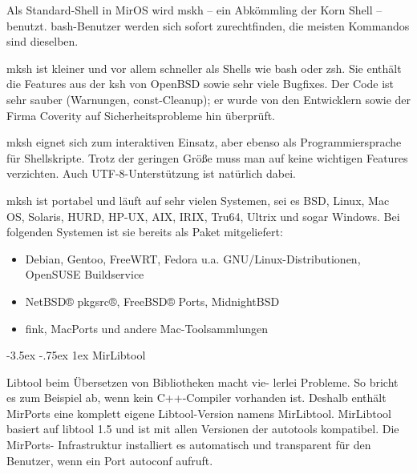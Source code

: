 \documentclass[
a4paper,landscape,%
notumble%
]{leaflet}
\makeatletter
\newcommand{\sectbox}[1]{%
 \noindent\protect\colorbox{yellow}{%
 \@tempdima=\hsize
 \advance\@tempdima by-2\fboxsep
 \advance\@tempdima by-2\fboxrule
 \protect\parbox{\@tempdima}{%
 \medskip
 \raggedright %
 #1 \medskip
}}}
\renewcommand\section{\@startsection{section}{1}{1em}%
  {-3.5ex \@plus -.75ex}%
  {1ex} %
  {\normalfont\Large\itshape\sectbox}}
\makeatother
\begin{document}
Als Standard-Shell in MirOS wird mskh – ein Abkömmling der Korn Shell – benutzt. bash-Benutzer werden sich sofort zurechtfinden, die meisten Kommandos sind dieselben.

mksh ist kleiner und vor allem schneller als Shells wie bash oder zsh. Sie enthält die Features aus der ksh von OpenBSD sowie sehr viele Bugfixes. Der Code ist sehr sauber (Warnungen, const-Cleanup); er wurde von den Entwicklern sowie der Firma Coverity auf Sicherheitsprobleme hin überprüft.

mksh eignet sich zum interaktiven Einsatz, aber ebenso als Programmiersprache für Shellskripte. Trotz der geringen Größe muss man auf keine wichtigen Features verzichten. Auch UTF-8-Unterstützung ist natürlich dabei.

mksh ist portabel und läuft auf sehr vielen Systemen, sei es BSD, Linux, Mac OS, Solaris, HURD, HP-UX, AIX, IRIX, Tru64, Ultrix und sogar Windows. Bei folgenden Systemen ist sie bereits als Paket mitgeliefert:

\begin{itemize}
\item Debian, Gentoo, FreeWRT, Fedora u.a. GNU/Linux-Distributionen, OpenSUSE Buildservice
\item NetBSD® pkgsrc®, FreeBSD® Ports, MidnightBSD
\item fink, MacPorts und andere Mac-Toolsammlungen
\end{itemize}

\section{MirLibtool}

Libtool beim Übersetzen von Bibliotheken macht vie-
lerlei Probleme. So bricht es zum Beispiel ab, wenn kein C++-Compiler vorhanden ist. Deshalb enthält MirPorts eine komplett eigene Libtool-Version namens MirLibtool.
MirLibtool basiert auf libtool 1.5 und ist mit allen Versionen der autotools kompatibel. Die MirPorts- Infrastruktur installiert es automatisch und transparent für den Benutzer, wenn ein Port autoconf aufruft.
\end{document}
